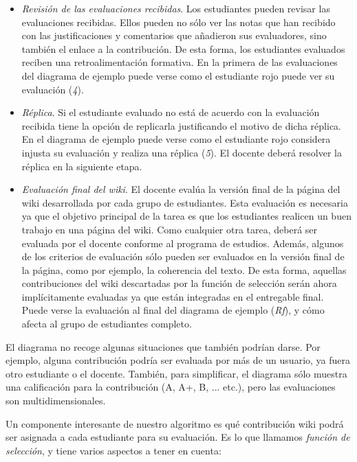 \begin{itemize}
				\item \emph{Revisión de las evaluaciones recibidas}. Los estudiantes pueden revisar las evaluaciones recibidas. Ellos pueden no sólo ver las notas que han recibido con las justificaciones y comentarios que añadieron sus evaluadores, sino también el enlace a la contribución. De esta forma, los estudiantes evaluados reciben una retroalimentación formativa. En la primera de las evaluaciones del diagrama de ejemplo puede verse como el estudiante rojo puede ver su evaluación (\emph{4}).
				\item \emph{Réplica}. Si el estudiante evaluado no está de acuerdo con la evaluación recibida tiene la opción de replicarla justificando el motivo de dicha réplica. En el diagrama de ejemplo puede verse como el estudiante rojo considera injusta su evaluación y realiza una réplica (\emph{5}). El docente deberá resolver la réplica en la siguiente etapa.
				\item \emph{Evaluación final del wiki}. El docente evalúa la versión final de la página del wiki desarrollada por cada grupo de estudiantes. Esta evaluación es necesaria ya que el objetivo principal de la tarea es que los estudiantes realicen un buen trabajo en una página del wiki. Como cualquier otra tarea, deberá ser evaluada por el docente conforme al programa de estudios. Además, algunos de los criterios de evaluación sólo pueden ser evaluados en la versión final de la página, como por ejemplo, la coherencia del texto. De esta forma, aquellas contribuciones del wiki descartadas por la función de selección serán ahora implícitamente evaluadas ya que están integradas en el entregable final. Puede verse la evaluación al final del diagrama de ejemplo (\emph{Rf}), y cómo afecta al grupo de estudiantes completo.
\end{itemize}

			El diagrama no recoge algunas situaciones que también podrían darse. Por ejemplo, alguna contribución podría ser evaluada por más de un usuario, ya fuera otro estudiante o el docente. También, para simplificar, el diagrama sólo muestra una calificación para la contribución (A, A+, B, ... etc.), pero las evaluaciones son multidimensionales.

			Un componente interesante de nuestro algoritmo es qué contribución wiki podrá ser asignada a cada estudiante para su evaluación. Es lo que llamamos \emph{función de selección}, y tiene varios aspectos a tener en cuenta:

